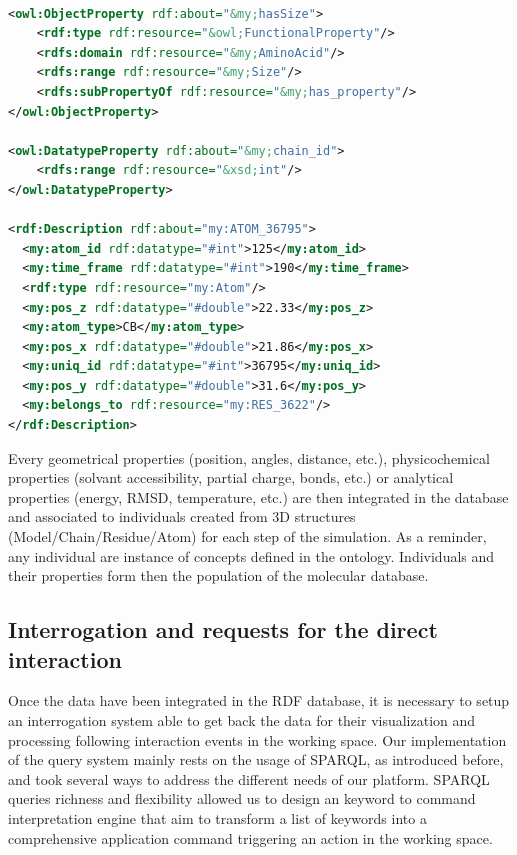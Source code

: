 \documentclass{vgtc}                          %
\begin{document}
\begin{lstlisting}[language=XML]

<owl:ObjectProperty rdf:about="&my;hasSize">
    <rdf:type rdf:resource="&owl;FunctionalProperty"/>
    <rdfs:domain rdf:resource="&my;AminoAcid"/>
    <rdfs:range rdf:resource="&my;Size"/>
    <rdfs:subPropertyOf rdf:resource="&my;has_property"/>
</owl:ObjectProperty>

<owl:DatatypeProperty rdf:about="&my;chain_id">
    <rdfs:range rdf:resource="&xsd;int"/>
</owl:DatatypeProperty>

<rdf:Description rdf:about="my:ATOM_36795">
  <my:atom_id rdf:datatype="#int">125</my:atom_id>
  <my:time_frame rdf:datatype="#int">190</my:time_frame>
  <rdf:type rdf:resource="my:Atom"/>
  <my:pos_z rdf:datatype="#double">22.33</my:pos_z>
  <my:atom_type>CB</my:atom_type>
  <my:pos_x rdf:datatype="#double">21.86</my:pos_x>
  <my:uniq_id rdf:datatype="#int">36795</my:uniq_id>
  <my:pos_y rdf:datatype="#double">31.6</my:pos_y>
  <my:belongs_to rdf:resource="my:RES_3622"/>
</rdf:Description>

\end{lstlisting}

Every geometrical properties (position, angles, distance, etc.), physicochemical properties (solvant accessibility, partial charge, bonds, etc.) or analytical properties (energy, RMSD, temperature, etc.) are then integrated in the database and associated to individuals created from 3D structures (Model/Chain/Residue/Atom) for each step of the simulation. As a reminder, any individual are instance of concepts defined in the ontology. Individuals and their properties form then the population of the molecular database.

\subsection{Interrogation and requests for the direct interaction}

Once the data have been integrated in the RDF database, it is necessary to setup an interrogation system able to get back the data for their visualization and processing following interaction events in the working space. Our implementation of the query system mainly rests on the usage of SPARQL, as introduced before, and took several ways to address the different needs of our platform. SPARQL queries richness and flexibility allowed us to design an keyword to command interpretation engine that aim to transform a list of keywords into a comprehensive application command triggering an action in the working space.
\end{document}
